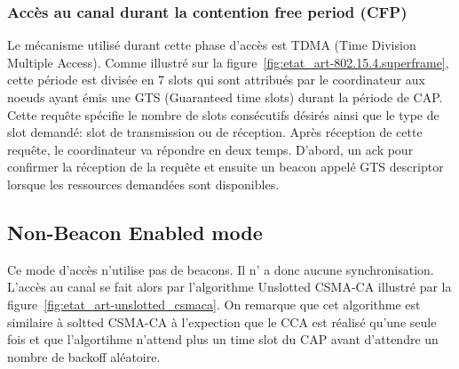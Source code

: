 \subsubsection{Accès au canal durant la contention free period (CFP)}
Le mécanisme utilisé durant cette phase d'accès est TDMA (Time Division Multiple Access).
Comme illustré sur la figure~\ref{fig:etat_art-802.15.4.superframe}, cette période est divisée
en 7 slots qui sont attribués par le coordinateur aux noeuds ayant émis une GTS (Guaranteed
time slots) durant la période de CAP.
Cette requête spécifie le nombre de slots consécutifs désirés ainsi que le type de slot demandé:
slot de transmission ou de réception.
Après réception de cette requête, le coordinateur va répondre en deux temps. D'abord, un ack pour
confirmer la réception de la requête et ensuite un beacon appelé GTS descriptor lorsque les ressources
demandées sont disponibles.

\subsection{Non-Beacon Enabled mode}\label{subsec:etat_art-802.15.4.nbe}
Ce mode d'accès n'utilise pas de beacons. Il n' a donc aucune synchronisation.
L'accès au canal se fait alors par l'algorithme Unslotted CSMA-CA illustré par la
figure~\ref{fig:etat_art-unslotted_csmaca}. On remarque que cet algorithme est similaire
à soltted CSMA-CA à l'expection que le CCA est réalisé qu'une seule fois et que l'algortihme
n'attend plus un time slot du CAP avant d'attendre un nombre de backoff aléatoire.


